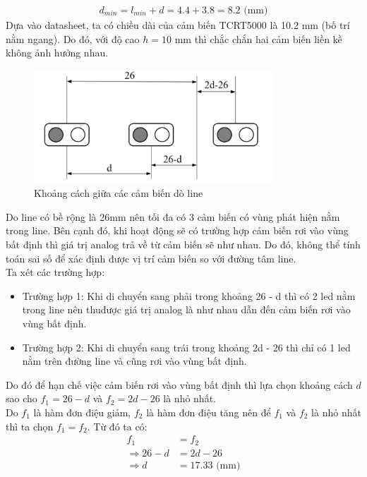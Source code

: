             \begin{align}
                d_{min} = l_{min} + d = 4.4 + 3.8 = 8.2 \text{ (mm)}
                \label{eq:4-4}
            \end{align}
            \hspace*{0.6cm}Dựa vào datasheet, ta có chiều dài của cảm biến TCRT5000 là 10.2 mm (bố trí nằm ngang). Do đó, với độ cao $h = 10$ mm thì chắc chắn hai cảm biến liền kề không ảnh hưởng nhau.\\[0.4cm]
            \begin{figure}[H]
                \centering
                \includegraphics[width=0.8\textwidth]{pictures/chapter4/c4_p12_SensorDistance.png}
                \caption{Khoảng cách giữa các cảm biến dò line}
                \label{fig:4-14}
            \end{figure}
            Do line có bề rộng là 26mm nên tối đa có 3 cảm biến có vùng phát hiện nằm trong line. Bên cạnh đó, khi hoạt động sẽ có trường hợp cảm biến rơi vào vùng bất định thì giá trị analog trả về từ cảm biến sẽ như nhau. Do đó, không thể tính toán sai số để xác định được vị trí cảm biến so với đường tâm line. \\
            \hspace*{0.6cm}Ta xét các trường hợp:
            \begin{itemize}
                \item Trường hợp 1: Khi di chuyển sang phải trong khoảng 26 - d thì có 2 led nằm trong line nên thuđược giá trị analog là như nhau dẫn đến cảm biến rơi vào vùng bất định. 
                \item Trường hợp 2: Khi di chuyển sang trái trong khoảng 2d - 26 thì chỉ có 1 led nằm trên đường line và cũng rơi vào vùng bất định. 
            \end{itemize}
            \hspace*{0.6cm}Do đó để hạn chế việc cảm biến rơi vào vùng bất định thì lựa chọn khoảng cách $d$ sao cho $f_1 = 26 - d$ và $f_2 = 2d - 26$ là nhỏ nhất. \\
            \hspace*{0.6cm}Do $f_1$ là hàm đơn điệu giảm, $f_2$ là hàm đơn điệu tăng nên để $f_1$ và $f_2$ là nhỏ nhất thì ta chọn $f_1 = f_2$. Từ đó ta có:
            \begin{align}
                f_1 &= f_2 \label{eq:4-5}\\
                \Rightarrow 26 - d &= 2d - 26 \nonumber \\
                \Rightarrow d &= 17.33 \text{ (mm)} \nonumber
            \end{align}
